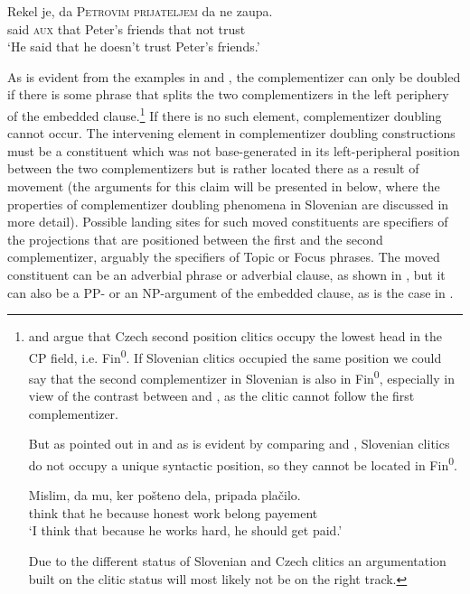 \documentclass[output=paper,
]{langscibook}
\begin{document}
\begin{exe} 
\ex \label{ex:plesnicar:two}
\gll Rekel	je,	da	\textsc{Petrovim}	\textsc{prijateljem}	da	ne	zaupa. \\
	said	\textsc{aux}	that	Peter’s		friends	that	not	trust\\
\trans `He said that he doesn’t trust Peter’s friends.' 
\end{exe}

\noindent\largerpage
As is evident from the examples in  and , the complementizer can only be doubled if there is some phrase that splits the two complementizers in the left periphery of the embedded clause.\footnote{\cite{lenertova2001} and \cite{Veselovska2008} argue that Czech second position clitics occupy the lowest head in the CP field, i.e. Fin\textsuperscript{0}. If Slovenian clitics occupied the same position we could say that the second complementizer in Slovenian is also in Fin\textsuperscript{0}, especially in view of the contrast between  and , as the clitic cannot follow the first complementizer. 

\z

\noindent But as pointed out in \cite{marusic2008} and as is evident by comparing  and , Slovenian clitics do not occupy a unique syntactic position, so they cannot be located in Fin\textsuperscript{0}. 

\begin{exe} 
\ex \label{ex:plesnicar:embtwo}
\gll Mislim, 	da 	mu, 	ker 	pošteno 	dela, 	pripada 	plačilo. \\
	think	that	he	because	honest	work	belong	payement\\
\trans `I think that because he works hard, he should get paid.' 
\end{exe}

\noindent Due to the different status of Slovenian and Czech clitics an argumentation built on the clitic status will most likely not be on the right track.} If there is no such element, complementizer doubling cannot occur. The intervening element in complementizer doubling constructions must be a constituent which was not base-generated in its left-peripheral position between the two complementizers but is rather located there as a result of movement (the arguments for this claim will be presented in  below, where the properties of complementizer doubling phenomena in Slovenian are discussed in more detail). Possible landing sites for such moved constituents are specifiers of the projections that are positioned between the first and the second complementizer, arguably the specifiers of Topic or Focus phrases. The moved constituent can be an adverbial phrase or adverbial clause, as shown in , but it can also be a PP- or an NP-argument of the embedded clause, as is the case in . 
\end{document}
